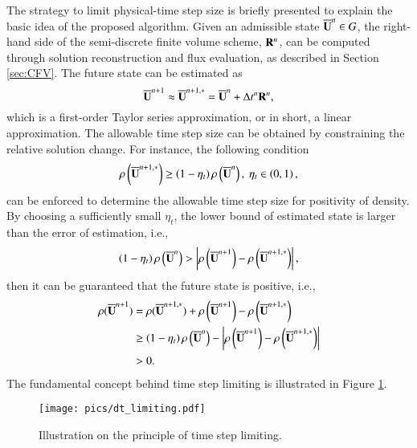The strategy to limit physical-time step size is briefly presented to explain the basic idea of the proposed algorithm. Given an admissible state $\overline{\mathbf{U}}^n \in G$, the right-hand side of the semi-discrete finite volume scheme, $\mathbf{R}^n$, can be computed through solution reconstruction and flux evaluation, as described in Section \ref{sec:CFV}. The future state can be estimated as
\begin{equation}
    \overline{\mathbf{U}}^{n+1} \approx \overline{\mathbf{U}}^{n+1,*}=\overline{\mathbf{U}}^n + \mathrm\Delta t^n \mathbf{R}^n,
\end{equation}
which is a first-order Taylor series approximation, or in short, a linear approximation. The allowable time step size can be obtained by constraining the relative solution change. For instance, the following condition
\begin{equation}
    \rho \left(\overline{\mathbf{U}}^{n+1,*}\right) \geq \left(1-\eta_t \right) \rho \left(\overline{\mathbf{U}}^n\right), \ \eta_t \in \left(0,1\right),
\end{equation}
can be enforced to determine the allowable time step size for positivity of density. By choosing a sufficiently small $\eta_t$, the lower bound of estimated state is larger than the error of estimation, i.e.,
\begin{equation}
    \left(1-\eta_t \right) \rho \left(\overline{\mathbf{U}}^n\right) > \left|\rho\left(\overline{\mathbf{U}}^{n+1}\right)-\rho\left(\overline{\mathbf{U}}^{n+1,*}\right) \right|,
\end{equation}
then it can be guaranteed that the future state is positive, i.e.,
\begin{equation}
\begin{aligned}
    \rho(\overline{\mathbf{U}}^{n+1}) &= \rho(\overline{\mathbf{U}}^{n+1,*}) + \rho\left(\overline{\mathbf{U}}^{n+1}\right)-\rho\left(\overline{\mathbf{U}}^{n+1,*}\right)  \\
    &\geq \left(1-\eta_t \right) \rho \left(\overline{\mathbf{U}}^n\right) - 
    \left|\rho\left(\overline{\mathbf{U}}^{n+1}\right)-\rho\left(\overline{\mathbf{U}}^{n+1,*}\right) \right| \\
    &>0.
\end{aligned}
\end{equation}
The fundamental concept behind time step limiting is illustrated in Figure \ref{fig:dt_limiting}.

\begin{figure}[htbp!]
    \centering
    \texttt{[image: pics/dt\_limiting.pdf]}
    \caption{Illustration on the principle of time step limiting.}
    \label{fig:dt_limiting}
\end{figure}


